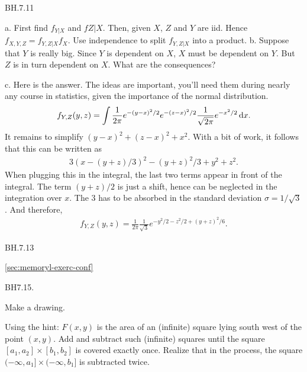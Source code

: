 \begin{exercise}
BH.7.11
\begin{hint}
a.
First find $f_{Y|X}$ and $f{Z|X}$. Then, given $X$, $Z$ and $Y$ are iid. Hence $f_{X,Y,Z} = f_{Y, Z |X} f_{X}$. Use independence to split $f_{Y,Z|X}$ into a product.
b.
Suppose that $Y$ is really big. Since $Y$ is dependent on $X$, $X$ must be dependent on $Y$. But $Z$ is in turn dependent on $X$. What are the consequences?

\end{hint}
\begin{solution}
 c.
Here is the answer. The ideas are important, you'll need them during nearly any course in statistics, given the importance of the normal distribution.
\begin{align*}
f_{Y,Z}(y, z) = \int \frac 1 {2\pi} e^{-(y-x)^2/2} e^{-(z-x)^2/2} \frac 1 {\sqrt{2\pi}} e^{-x^2/2}\,\textrm{d}x.
\end{align*}
It remains to simplify $(y-x)^2 + (z-x)^2 + x^2$. With a bit of work, it follows that this can be written as
\begin{align*}
3(x-(y+z)/3)^{2} - (y+z)^2/3+y^2+z^2.
\end{align*}
When plugging this in the integral, the last two terms appear in front of the integral. The term $(y+z)/2$ is just a shift, hence can be neglected in the integration over $x$. The $3$ has to be absorbed in the standard deviation $\sigma=1/\sqrt{3}$. And therefore,
\begin{align*}
f_{Y,Z}(y, z) = \frac 1 {2\pi} \frac 1 {\sqrt{3}} e^{-y^2/2 - z^2/2 + (y+z)^2/6}.
\end{align*}
\end{solution}
\end{exercise}

\begin{exercise}
BH.7.13
\begin{hint}
\cref{sec:memoryl-exerc-conf}
\end{hint}
\begin{solution}
\end{solution}
\end{exercise}

\begin{exercise}
BH7.15.
\begin{hint}
Make a drawing.
\end{hint}
\begin{solution}
Using the hint: $F(x,y)$ is the area of an (infinite) square lying  south west of the point $(x,y)$. Add and subtract such (infinite) squares until the square $[a_1,a_2] \times [b_{1},b_2]$ is covered exactly once. Realize that in the process, the square $(-\infty, a_1] \times (-\infty, b_1]$ is subtracted twice.
\end{solution}
\end{exercise}


